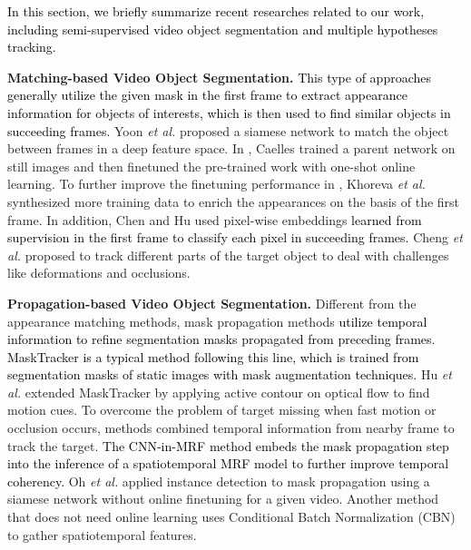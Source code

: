 \documentclass[10pt,twocolumn,letterpaper]{article}
\newcommand{\bao}[1]{\textcolor{black}{#1}}
\begin{document}
\bao{
In this section, we briefly summarize recent researches related to our work, including semi-supervised video object segmentation and multiple hypotheses tracking. 
}

\textbf{Matching-based Video Object Segmentation.} 
\bao{This type of approaches generally utilize the given mask in the first frame to extract appearance information for objects of interests, which is then used to find similar objects in succeeding frames.}  
Yoon \emph{et al.} \cite{yoon2017pixel} proposed a siamese network to match the object between frames in a deep feature space. In \cite{caelles2017one}, Caelles trained a parent network on still images and then finetuned the pre-trained work with one-shot online learning. To further improve the finetuning performance in \cite{caelles2017one}, Khoreva \emph{et al.} \cite{khoreva2017lucid} synthesized more training data to enrich the appearances on the basis of the first frame. In addition, Chen \etal \cite{chen2018blazingly} and Hu \etal \cite{hu2018videomatch} used pixel-wise embeddings \bao{learned from supervision in the first frame to classify each pixel in succeeding frames.}
Cheng \emph{et al.} \cite{cheng2018fast} proposed to track different parts of the target object to deal with challenges like deformations and occlusions. 


\textbf{Propagation-based Video Object Segmentation.} 
Different from the appearance  matching methods, mask propagation methods \bao{utilize temporal information to refine segmentation masks propagated from preceding frames}. 
\bao{MaskTracker \cite{perazzi2017learning} is a typical method following this line, which is trained from segmentation masks of static images with mask augmentation techniques.} 
Hu \emph{et al.} \cite{hu2018motion} extended MaskTracker \cite{perazzi2017learning} by applying active contour on optical flow to find motion cues. To overcome the problem of target missing when fast motion or occlusion occurs, methods \cite{xiao2018monet, wang2018fully} combined temporal information from nearby frame to track the target. 
\bao{The CNN-in-MRF method \cite{bao2018cnn} embeds the mask propagation step into the inference of a spatiotemporal MRF model to further improve temporal coherency.} 
Oh \emph{et al.} \cite{wug2018fast} applied instance detection to mask propagation using a siamese network without online finetuning for a given video. Another method \cite{yang2018efficient} that does not need online learning uses Conditional Batch Normalization (CBN) to gather spatiotemporal features. 
\end{document}
